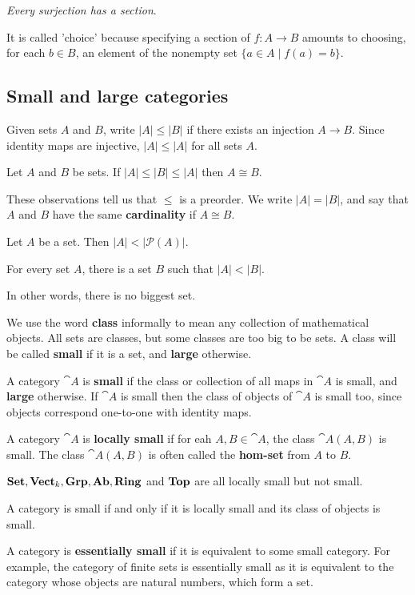 \documentclass[11pt,a4paper]{article}
\begin{document}
\smallskip \textit{Every surjection has a section}.\smallskip

It is called 'choice' because specifying a section of $f:A\to B$ amounts to choosing, for each $b\in B$, an element of the nonempty set $\{ a\in A\mid f(a)=b \}$.

\subsection{Small and large categories}
Given sets $A$ and $B$, write $\vert A\vert\leq\vert B\vert$ if there exists an injection $A\to B$. Since identity maps are injective, $\vert A\vert\leq\vert A\vert$ for all sets $A$.
\begin{theorem}
    Let $A$ and $B$ be sets. If $\vert A\vert\leq\vert B\vert\leq\vert A\vert$ then $A\cong B$.
\end{theorem}
These observations tell us that $\leq$ is a preorder. We write $\vert A\vert = \vert B\vert$, and say that $A$ and $B$ have the same \textbf{cardinality} if $A\cong B$.

\begin{theorem}
    Let $A$ be a set. Then $\vert A\vert < \vert \mathcal{P}(A)\vert$.
\end{theorem}

\begin{corollary}
    For every set $A$, there is a set $B$ such that $\vert A\vert < \vert B\vert$.
\end{corollary}
In other words, there is no biggest set.\par

We use the word \textbf{class} informally to mean any collection of mathematical objects. All sets are classes, but some classes are too big to be sets. A class will be called \textbf{small} if it is a set, and \textbf{large} otherwise.\par
A category $\cat{A}$ is \textbf{small} if the class or collection of all maps in $\cat{A}$ is small, and \textbf{large} otherwise. If $\cat{A}$ is small then the class of objects of $\cat{A}$ is small too, since objects correspond one-to-one with identity maps.\par
A category $\cat{A}$ is \textbf{locally small} if for eah $A, B\in\cat{A}$, the class $\cat{A}(A,B)$ is small. The class $\cat{A}(A,B)$ is often called the \textbf{hom-set} from $A$ to $B$.

\begin{example}
    $\mathbf{Set}, \mathbf{Vect}_k, \mathbf{Grp}, \mathbf{Ab}, \mathbf{Ring}$ and $\mathbf{Top}$ are all locally small but not small.
\end{example}
A category is small if and only if it is locally small and its class of objects is small.\par
A category is \textbf{essentially small} if it is equivalent to some small category. For example, the category of finite sets is essentially small as it is equivalent to the category whose objects are natural numbers, which form a set.\par
\end{document}
